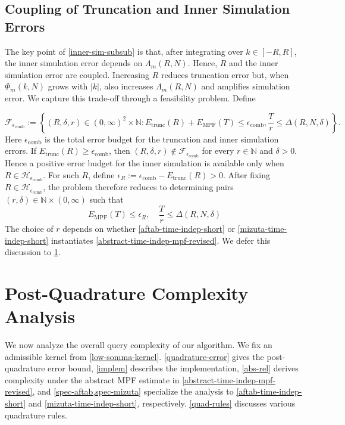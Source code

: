 \documentclass[10pt,reqno]{article}
\numberwithin{equation}{section}
\theoremstyle{plain}
\theoremstyle{definition}
\begin{document}
\subsection{Coupling of Truncation and Inner Simulation Errors}\label{coupling-subsub}
The key point of \cref{inner-sim-subsub} is that, after integrating over \(k\in[-R,R]\), the inner simulation error depends on \(\Lambda_m(R,N)\). Hence, \(R\) and the inner simulation error are coupled. Increasing \(R\) reduces truncation error but, when \(\Phi_m(k,N)\) grows with \(|k|\), also increases \(\Lambda_m(R,N)\) and amplifies simulation error. We capture this trade-off through a feasibility problem. Define

\begin{equation}\label{varf-def}
\mathcal{F}_{\epsilon_{\operatorname{comb}}} := \left\{ (R,\delta,r)\in(0,\infty)^2\times\mathbb{N} : E_{\mathrm{trunc}}(R) + E_{\mathrm{MPF}}(T) \le \epsilon_{\operatorname{comb}}, \frac{T}{r} \le \Delta(R,N,\delta) \right\}.
\end{equation}
Here $\epsilon_{\operatorname{comb}}$ is the total error budget for the truncation and inner simulation errors. If \(E_{\mathrm{trunc}}(R) \geq \epsilon_{\mathrm{comb}}\), then \((R,\delta,r)\notin \mathcal F_{\epsilon_{\mathrm{comb}}}\) for every \(r\in\mathbb N\) and \(\delta>0\). Hence a positive error budget for the inner simulation is available only when \(R\in\mathcal H_{\epsilon_{\mathrm{comb}}}\). For such \(R\), define $\epsilon_R := \epsilon_{\mathrm{comb}}-E_{\mathrm{trunc}}(R)>0$.  After fixing $R \in \mathcal H_{\epsilon_{\mathrm{comb}}}$, the problem therefore reduces to determining pairs \((r,\delta)\in\mathbb N\times(0,\infty)\) such that
\begin{equation}
E_{\mathrm{MPF}}(T) \le \epsilon_R, \quad \frac{T}{r} \le \Delta(R,N,\delta)
\label{eq:feasibility-reduced}
\end{equation}
The choice of \(r\) depends on whether \cref{aftab-time-indep-short} or \cref{mizuta-time-indep-short} instantiates \cref{abstract-time-indep-mpf-revised}. We defer this discussion to \cref{complexity-analysis}.


\section{Post-Quadrature Complexity Analysis}\label{complexity-analysis}
We now analyze the overall query complexity of our algorithm. We fix an admissible kernel from \cref{low-somma-kernel}. \cref{quadrature-error} gives the post-quadrature error bound, \cref{implem} describes the implementation, \cref{abs-rel} derives complexity under the abstract MPF estimate in \cref{abstract-time-indep-mpf-revised}, and \cref{spec-aftab,spec-mizuta} specialize the analysis to \cref{aftab-time-indep-short} and \cref{mizuta-time-indep-short}, respectively. \cref{quad-rules} discusses various quadrature rules.
\end{document}
